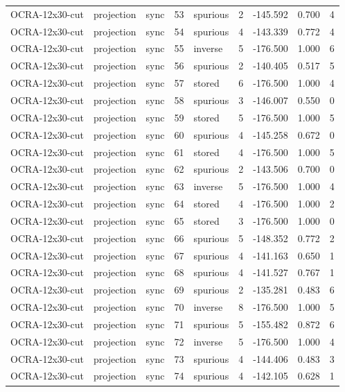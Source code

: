 \begin{tabular}{lllrlrrrr}
OCRA-12x30-cut & projection & sync & 53 & spurious & 2 & -145.592 & 0.700 & 4 \\
OCRA-12x30-cut & projection & sync & 54 & spurious & 4 & -143.339 & 0.772 & 4 \\
OCRA-12x30-cut & projection & sync & 55 & inverse & 5 & -176.500 & 1.000 & 6 \\
OCRA-12x30-cut & projection & sync & 56 & spurious & 2 & -140.405 & 0.517 & 5 \\
OCRA-12x30-cut & projection & sync & 57 & stored & 6 & -176.500 & 1.000 & 4 \\
OCRA-12x30-cut & projection & sync & 58 & spurious & 3 & -146.007 & 0.550 & 0 \\
OCRA-12x30-cut & projection & sync & 59 & stored & 5 & -176.500 & 1.000 & 5 \\
OCRA-12x30-cut & projection & sync & 60 & spurious & 4 & -145.258 & 0.672 & 0 \\
OCRA-12x30-cut & projection & sync & 61 & stored & 4 & -176.500 & 1.000 & 5 \\
OCRA-12x30-cut & projection & sync & 62 & spurious & 2 & -143.506 & 0.700 & 0 \\
OCRA-12x30-cut & projection & sync & 63 & inverse & 5 & -176.500 & 1.000 & 4 \\
OCRA-12x30-cut & projection & sync & 64 & stored & 4 & -176.500 & 1.000 & 2 \\
OCRA-12x30-cut & projection & sync & 65 & stored & 3 & -176.500 & 1.000 & 0 \\
OCRA-12x30-cut & projection & sync & 66 & spurious & 5 & -148.352 & 0.772 & 2 \\
OCRA-12x30-cut & projection & sync & 67 & spurious & 4 & -141.163 & 0.650 & 1 \\
OCRA-12x30-cut & projection & sync & 68 & spurious & 4 & -141.527 & 0.767 & 1 \\
OCRA-12x30-cut & projection & sync & 69 & spurious & 2 & -135.281 & 0.483 & 6 \\
OCRA-12x30-cut & projection & sync & 70 & inverse & 8 & -176.500 & 1.000 & 5 \\
OCRA-12x30-cut & projection & sync & 71 & spurious & 5 & -155.482 & 0.872 & 6 \\
OCRA-12x30-cut & projection & sync & 72 & inverse & 5 & -176.500 & 1.000 & 4 \\
OCRA-12x30-cut & projection & sync & 73 & spurious & 4 & -144.406 & 0.483 & 3 \\
OCRA-12x30-cut & projection & sync & 74 & spurious & 4 & -142.105 & 0.628 & 1 \\

\end{tabular}
